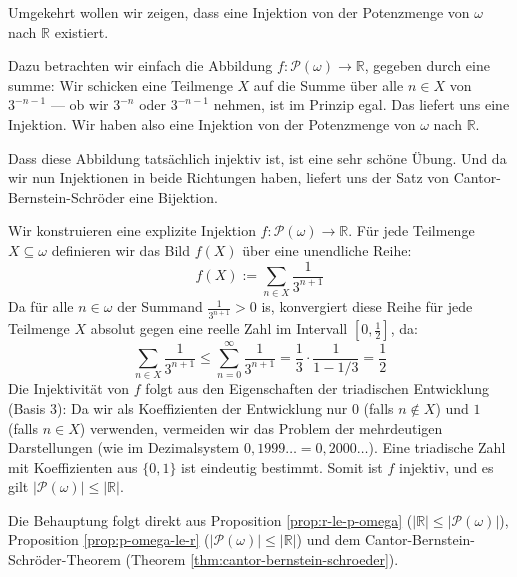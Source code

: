 \begin{spoken-clean}[00:37:51 - 00:40:36]
Umgekehrt wollen wir zeigen, dass eine Injektion von der Potenzmenge von $\omega$ nach $\mathbb{R}$ existiert.

Dazu betrachten wir einfach die Abbildung $f \colon \mathcal{P}(\omega) \to \mathbb{R}$, gegeben durch eine summe: Wir schicken eine Teilmenge $X$ auf die Summe über alle $n \in X$ von $3^{-n-1}$ --- ob wir $3^{-n}$ oder $3^{-n-1}$ nehmen, ist im Prinzip egal. Das liefert uns eine Injektion. Wir haben also eine Injektion von der Potenzmenge von $\omega$ nach $\mathbb{R}$.

Dass diese Abbildung tatsächlich injektiv ist, ist eine sehr schöne Übung. Und da wir nun Injektionen in beide Richtungen haben, liefert uns der Satz von Cantor-Bernstein-Schröder eine Bijektion.
\end{spoken-clean}

\begin{math-stroke}
\begin{short-proof}
Wir konstruieren eine explizite Injektion $f \colon \mathcal{P}(\omega) \to \mathbb{R}$. Für jede Teilmenge $X \subseteq \omega$ definieren wir das Bild $f(X)$ über eine unendliche Reihe:
\begin{equation}\label{eq:ternary-injection}
f(X) := \sum_{n \in X} \frac{1}{3^{n+1}}
\end{equation}
Da für alle $n \in \omega$ der Summand $\frac{1}{3^{n+1}} > 0$ is, konvergiert diese Reihe für jede Teilmenge $X$ absolut gegen eine reelle Zahl im Intervall $[0, \frac{1}{2}]$, da:
\[
\sum_{n \in X} \frac{1}{3^{n+1}} \le \sum_{n=0}^\infty \frac{1}{3^{n+1}} = \frac{1}{3} \cdot \frac{1}{1 - 1/3} = \frac{1}{2}
\]
Die Injektivität von $f$ folgt aus den Eigenschaften der triadischen Entwicklung (Basis 3): Da wir als Koeffizienten der Entwicklung nur $0$ (falls $n \notin X$) und $1$ (falls $n \in X$) verwenden, vermeiden wir das Problem der mehrdeutigen Darstellungen (wie im Dezimalsystem $0{,}1999\dots = 0{,}2000\dots$). Eine triadische Zahl mit Koeffizienten aus $\{0, 1\}$ ist eindeutig bestimmt. Somit ist $f$ injektiv, und es gilt $|\mathcal{P}(\omega)| \le |\mathbb{R}|$.
\end{short-proof}

\begin{short-proof}
Die Behauptung folgt direkt aus Proposition \ref{prop:r-le-p-omega} ($|\mathbb{R}| \le |\mathcal{P}(\omega)|$), Proposition \ref{prop:p-omega-le-r} ($|\mathcal{P}(\omega)| \le |\mathbb{R}|$) und dem Cantor-Bernstein-Schröder-Theorem (Theorem \ref{thm:cantor-bernstein-schroeder}).
\end{short-proof}
\end{math-stroke}

